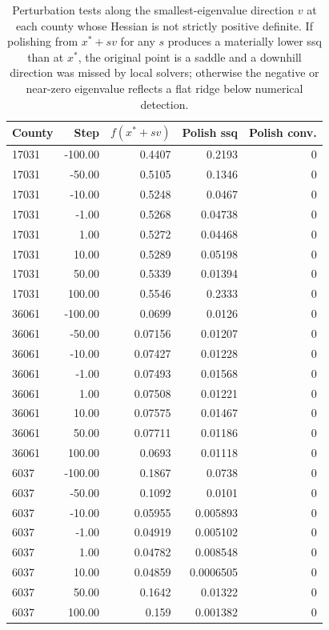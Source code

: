 \begin{table}[ht]
\centering
\caption{Perturbation tests along the smallest-eigenvalue direction $v$ at each county whose Hessian is not strictly positive definite. If polishing from $x^* + s v$ for any $s$ produces a materially lower ssq than at $x^*$, the original point is a saddle and a downhill direction was missed by local solvers; otherwise the negative or near-zero eigenvalue reflects a flat ridge below numerical detection.} 
\label{tab:wage_perturbation}
\begin{tabular}{lrrrr}
  \toprule
County & Step & $f(x^* + s v)$ & Polish ssq & Polish conv. \\ 
  \midrule
17031 & -100.00 & 0.4407 & 0.2193 &   0 \\ 
  17031 & -50.00 & 0.5105 & 0.1346 &   0 \\ 
  17031 & -10.00 & 0.5248 & 0.0467 &   0 \\ 
  17031 & -1.00 & 0.5268 & 0.04738 &   0 \\ 
  17031 & 1.00 & 0.5272 & 0.04468 &   0 \\ 
  17031 & 10.00 & 0.5289 & 0.05198 &   0 \\ 
  17031 & 50.00 & 0.5339 & 0.01394 &   0 \\ 
  17031 & 100.00 & 0.5546 & 0.2333 &   0 \\ 
  36061 & -100.00 & 0.0699 & 0.0126 &   0 \\ 
  36061 & -50.00 & 0.07156 & 0.01207 &   0 \\ 
  36061 & -10.00 & 0.07427 & 0.01228 &   0 \\ 
  36061 & -1.00 & 0.07493 & 0.01568 &   0 \\ 
  36061 & 1.00 & 0.07508 & 0.01221 &   0 \\ 
  36061 & 10.00 & 0.07575 & 0.01467 &   0 \\ 
  36061 & 50.00 & 0.07711 & 0.01186 &   0 \\ 
  36061 & 100.00 & 0.0693 & 0.01118 &   0 \\ 
  6037 & -100.00 & 0.1867 & 0.0738 &   0 \\ 
  6037 & -50.00 & 0.1092 & 0.0101 &   0 \\ 
  6037 & -10.00 & 0.05955 & 0.005893 &   0 \\ 
  6037 & -1.00 & 0.04919 & 0.005102 &   0 \\ 
  6037 & 1.00 & 0.04782 & 0.008548 &   0 \\ 
  6037 & 10.00 & 0.04859 & 0.0006505 &   0 \\ 
  6037 & 50.00 & 0.1642 & 0.01322 &   0 \\ 
  6037 & 100.00 & 0.159 & 0.001382 &   0 \\ 
   \bottomrule
\end{tabular}
\end{table}
